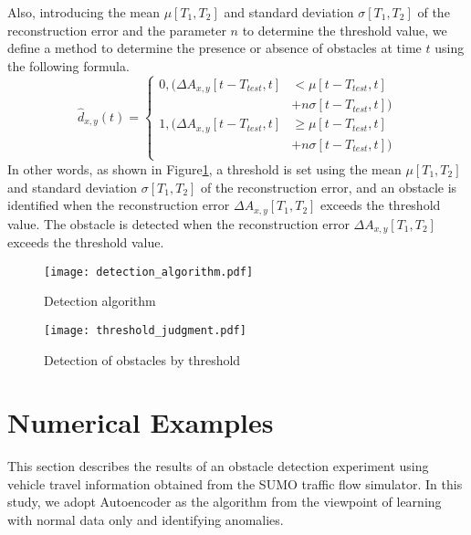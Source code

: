 \documentclass[paper]{ieice}
\begin{document}
%
Also, introducing the mean $\mu[T_1,T_2]$ and standard deviation $\sigma[T_1,T_2]$ of the reconstruction error and the parameter $n$ to determine the threshold value, we define a method to determine the presence or absence of obstacles at time $t$ using the following formula.
%
\begin{equation}
  \hat{d}_{x,y}(t) =
  \begin{cases}
    0, (\Delta{A}_{x,y}[t-T_{test},t] & < \mu[t-T_{test},t]      \\
                                      & + n\sigma[t-T_{test},t]) \\
    1, (\Delta{A}_{x,y}[t-T_{test},t] & \geq \mu[t-T_{test},t]   \\
                                      & + n\sigma[t-T_{test},t]) \\
  \end{cases}
  \label{eq:discrimination}
\end{equation}
%
In other words, as shown in Figure\ref{fig:detection_algorithm}, a threshold is set using the mean $\mu[T_1,T_2]$ and standard deviation $\sigma[T_1,T_2]$ of the reconstruction error, and an obstacle is identified when the reconstruction error $\Delta A_{x,y}[T_1,T_2]$ exceeds the threshold value. The obstacle is detected when the reconstruction error $\Delta A_{x,y}[T_1,T_2]$ exceeds the threshold value.
%
\begin{figure}[tb]
  \centering
  \texttt{[image: detection\_algorithm.pdf]}
  \caption{Detection algorithm}
  \label{fig:detection_algorithm}
\end{figure}
%
\begin{figure}[tb]
  \begin{center}
    \texttt{[image: threshold\_judgment.pdf]}
  \end{center}
  \caption{Detection of obstacles by threshold}
  \label{fig:threshold_judgment}
\end{figure}
%
\section{Numerical Examples}
\label{sec:result}
%
This section describes the results of an obstacle detection experiment using vehicle travel information obtained from the SUMO traffic flow simulator.
%
%
In this study, we adopt Autoencoder as the algorithm from the viewpoint of learning with normal data only and identifying anomalies.
%


\begin{thebibliography}{99}%
\bibitem{}
\end{thebibliography}

\end{document}
